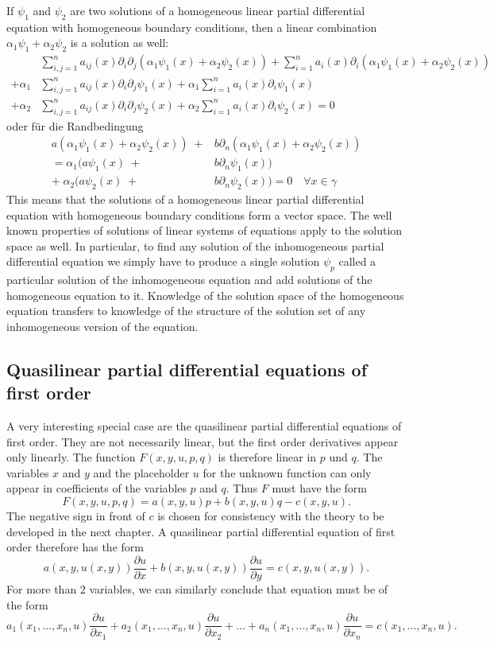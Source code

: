 If $\psi_1$ and $\psi_2$ are two solutions of a homogeneous linear partial
differential equation with homogeneous boundary conditions, then
a linear combination $\alpha_1\psi_1+\alpha_2\psi_2$ is a solution
as well:
\begin{align*}
&\sum_{i,j=1}^n a_{ij}(x)\partial_i \partial_j
(\alpha_1\psi_1(x)+\alpha_2\psi_2(x))
+\sum_{i=1}^na_i(x)\partial_i
(\alpha_1\psi_1(x)+\alpha_2\psi_2(x))
\\
+
\alpha_1
&\sum_{i,j=1}^n a_{ij}(x)\partial_i \partial_j
\psi_1(x)
+
\alpha_1
\sum_{i=1}^na_i(x)\partial_i
\psi_1(x)
\\
+
\alpha_2
&\sum_{i,j=1}^n a_{ij}(x)\partial_i \partial_j
\psi_2(x)
+
\alpha_2
\sum_{i=1}^na_i(x)\partial_i
\psi_2(x)
=0
\end{align*}
oder für die Randbedingung
\begin{align*}
a(\alpha_1\psi_1(x) +\alpha_2\psi_2(x))
\;+&b\partial_n
(\alpha_1\psi_1(x) +\alpha_2\psi_2(x))\\
=\alpha_1(a\psi_1(x)
\;+&b\partial_n
\psi_1(x))\\
+\;\alpha_2(a\psi_2(x)
\;+&b\partial_n
\psi_2(x))
=0\quad\forall x\in\gamma
\end{align*}
This means that the solutions of a homogeneous linear
partial differential equation with homogeneous boundary conditions
form a vector space.
The well known properties of solutions of linear systems of equations
apply to the solution space as well.
In particular, to find any solution of the inhomogeneous partial
differential equation we simply have to produce a single solution
$\psi_p$ called a particular solution of the inhomogeneous equation
and add solutions of the homogeneous equation to it.
Knowledge of the solution space of the homogeneous equation transfers
to knowledge of the structure of the solution set of any inhomogeneous
version of the equation.

\subsection{Quasilinear partial differential equations of first order
\label{klassifikation:quasilinear}}
A very interesting special case are the quasilinear partial differential
equations of first order.
They are not necessarily linear, but the first order derivatives appear only
linearly.
The function
$
F(x,y,u,p,q)
$
is therefore linear in $p$ und $q$.
The variables $x$ and $y$ and the placeholder $u$ for the unknown
function can only appear in coefficients of the variables $p$ and $q$.
Thus $F$ must have the form
\[
F(x,y,u,p,q)=a(x,y,u)p+b(x,y,u)q-c(x,y,u).
\]
The negative sign in front of $c$ is chosen for consistency with the
theory to be developed in the next chapter.
A quasilinear partial differential equation of first order therefore
has the form
\[
a(x,y,u(x,y))\frac{\partial u}{\partial x}+b(x,y,u(x,y))\frac{\partial u}{\partial y}
=c(x,y,u(x,y)).
\]
For more than $2$ variables, we can similarly conclude that equation must
be of the form
\[
a_1(x_1,\dots,x_n,u)\frac{\partial u}{\partial x_1}
+
a_2(x_1,\dots,x_n,u)\frac{\partial u}{\partial x_2}
+\dots
+
a_n(x_1,\dots,x_n,u)\frac{\partial u}{\partial x_n}
=c(x_1,\dots,x_n,u).
\]

